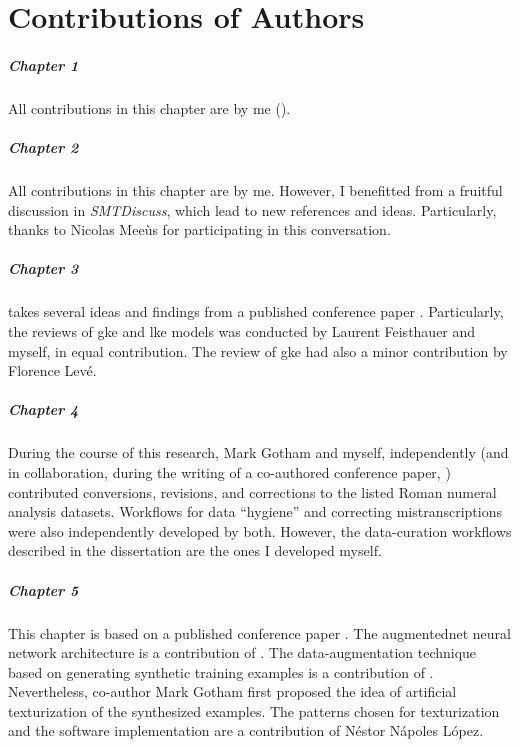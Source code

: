 \chapter*{Contributions of Authors}
\label{chap:contributionsofauthors}

\paragraph{Chapter 1}
All contributions in this chapter are by me (\myself{}).

\paragraph{Chapter 2}
All contributions in this chapter are by me. However, I
benefitted from a fruitful discussion in
\emph{SMTDiscuss},
which lead to new references and ideas. Particularly, thanks
to Nicolas Mee\`us for participating in this conversation.

\paragraph{Chapter 3} 
 takes several ideas and findings
from a published conference paper
\parencite{napoleslopez2020local}. Particularly, the reviews
of \gls{gke} and \gls{lke} models was conducted by Laurent
Feisthauer and myself, in equal contribution. The review of
\gls{gke} had also a minor contribution by Florence Lev\'e.

\paragraph{Chapter 4} 
During the course of this research, Mark Gotham and myself,
independently (and in collaboration, during the writing of a
co-authored conference paper,
\cite{napoleslopez2021augmentednet}) contributed
conversions, revisions, and corrections to the listed Roman
numeral analysis datasets. Workflows for data ``hygiene''
and correcting mistranscriptions were also independently
developed by both. However, the data-curation workflows
described in the dissertation are the ones I developed
myself. 

\paragraph{Chapter 5}
This chapter is based on a published conference paper
\parencite{napoleslopez2021augmentednet}. The
\gls{augmentednet} neural network architecture is a
contribution of \myself{}. The data-augmentation technique
based on generating synthetic training examples is a
contribution of \myself{}. Nevertheless, co-author Mark
Gotham first proposed the idea of artificial texturization
of the synthesized examples. The patterns chosen for
texturization and the software implementation are a
contribution of N\'estor N\'apoles L\'opez.

